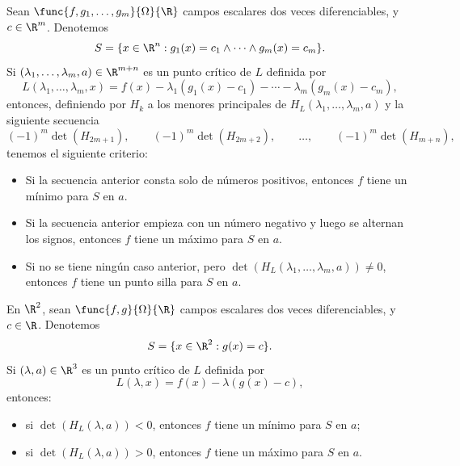 \documentclass[a4,11pt]{aleph-notas}
\begin{document}
\begin{teo}
    Sean $\func{f,g_1,\ldots,g_m}{\Omega}{\R}$ campos escalares dos veces diferenciables, y $c\in \R^m$. Denotemos
    \[
        S = \{x\in \R^n: g_1(x)=c_1\land\cdots\land g_m(x)=c_m\}.
    \]
    Si $(\lambda_1,\ldots,\lambda_m,a)\in\R^{m+n}$ es un punto crítico de $L$ definida por
    \[
        L(\lambda_1,\ldots,\lambda_m,x) = f(x) - \lambda_1 (g_1(x)-c_1) - \cdots
        - \lambda_m (g_m(x)-c_m),
    \]
    entonces, definiendo por $H_k$ a los menores principales de $H_L(\lambda_1,\ldots,\lambda_m,a)$ y la siguiente secuencia
    \[
        (-1)^m\det(H_{2m+1}),\qquad
        (-1)^m\det(H_{2m+2}),\qquad
        \ldots,\qquad
        (-1)^m\det(H_{m+n}),
    \]
    tenemos el siguiente criterio:
    \begin{itemize}
        \item Si la secuencia anterior consta solo de números positivos, entonces $f$ tiene un mínimo para $S$ en $a$.
        \item Si la secuencia anterior empieza con un número negativo y luego se alternan los signos, entonces $f$ tiene un máximo para $S$ en $a$.
        \item Si no se tiene ningún caso anterior, pero $\det(H_L(\lambda_1,\ldots,\lambda_m,a))\neq 0$, entonces $f$ tiene un punto silla para $S$ en $a$.
    \end{itemize}
\end{teo}

\begin{teo}
    En $\R^2$, sean $\func{f,g}{\Omega}{\R}$ campos escalares dos veces diferenciables, y $c\in \R$. Denotemos
    \[
        S = \{x\in \R^2: g(x)=c\}.
    \]
    Si $(\lambda,a)\in\R^{3}$ es un punto crítico de $L$ definida por
    \[
        L(\lambda,x) = f(x) - \lambda (g(x)-c),
    \]
    entonces:
    \begin{itemize}
        \item si $\det(H_L(\lambda,a))<0$, entonces $f$ tiene un mínimo para $S$ en $a$;
        \item si $\det(H_L(\lambda,a))>0$, entonces $f$ tiene un máximo para $S$ en $a$.
    \end{itemize}
\end{teo}
\end{document}
